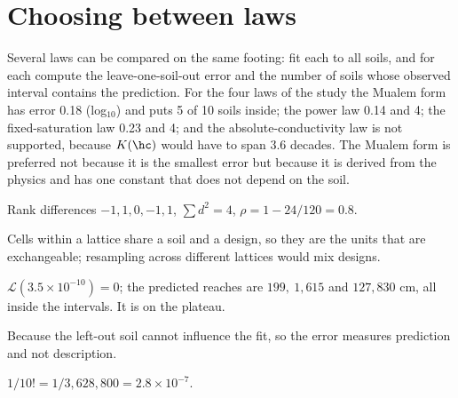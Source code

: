 
\section{Choosing between laws}
Several laws can be compared on the same footing: fit each to all soils, and for each compute the leave-one-soil-out error and the number of soils whose observed interval contains the prediction. For the four laws of the study the Mualem form has error 0.18 (log$_{10}$) and puts 5 of 10 soils inside; the power law 0.14 and 4; the fixed-saturation law 0.23 and 4; and the absolute-conductivity law is not supported, because $K(\hc)$ would have to span 3.6 decades. The Mualem form is preferred not because it is the smallest error but because it is derived from the physics and has one constant that does not depend on the soil.

\sol  Rank differences $-1,1,0,-1,1$, $\sum d^2=4$, $\rho=1-24/120=0.8$.

\sol  Cells within a lattice share a soil and a design, so they are the units that are exchangeable; resampling across different lattices would mix designs.

\sol  $\mathcal L(3.5\times10^{-10})=0$; the predicted reaches are $199,\ 1{,}615$ and $127{,}830$ cm, all inside the intervals. It is on the plateau.

\sol  Because the left-out soil cannot influence the fit, so the error measures prediction and not description.

\sol  $1/10!=1/3{,}628{,}800=2.8\times10^{-7}$.

